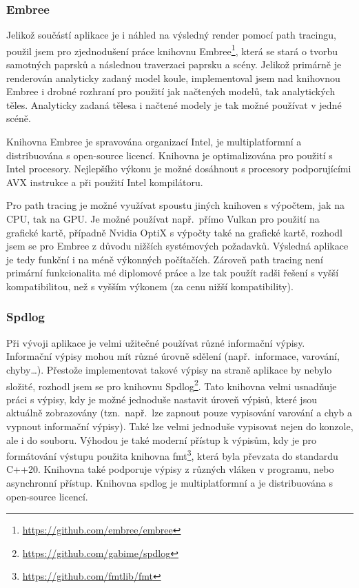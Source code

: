 \documentclass[czech,master]{diploma}
\begin{document}
\subsubsection{Embree}
Jelikož součástí aplikace je i náhled na výsledný render pomocí path tracingu, použil jsem pro zjednodušení práce knihovnu Embree\footnote{\url{https://github.com/embree/embree}}, která se stará o tvorbu samotných paprsků a následnou traverzaci paprsku a scény. Jelikož primárně je renderován analyticky zadaný model koule, implementoval jsem nad knihovnou Embree i drobné rozhraní pro použití jak načtených modelů, tak analytických těles. Analyticky zadaná tělesa i načtené modely je tak možné používat v jedné scéně. \par
Knihovna Embree je spravována organizací Intel, je multiplatformní a distribuována s open-source licencí. Knihovna je optimalizována pro použití s Intel procesory. Nejlepšího výkonu je možné dosáhnout s procesory podporujícími AVX instrukce a při použití Intel kompilátoru. \par
Pro path tracing je možné využívat spoustu jiných knihoven s výpočtem, jak na CPU, tak na GPU\@. Je možné používat např.\ přímo Vulkan pro použití na grafické kartě, případně Nvidia OptiX s výpočty také na grafické kartě, rozhodl jsem se pro Embree z důvodu nižších systémových požadavků. Výsledná aplikace je tedy funkční i na méně výkonných počítačích. Zároveň path tracing není primární funkcionalita mé diplomové práce a lze tak použít radši řešení s vyšší kompatibilitou, než s vyšším výkonem (za cenu nižší kompatibility).

\subsubsection{Spdlog}
Při vývoji aplikace je velmi užitečné používat různé informační výpisy. Informační výpisy mohou mít různé úrovně sdělení (např.\ informace, varování, chyby\dots). Přestože implementovat takové výpisy na straně aplikace by nebylo složité, rozhodl jsem se pro knihovnu Spdlog\footnote{\url{https://github.com/gabime/spdlog}}. Tato knihovna velmi usnadňuje práci s výpisy, kdy je možné jednoduše nastavit úroveň výpisů, které jsou aktuálně zobrazovány (tzn.\ např.\ lze zapnout pouze vypisování varování a chyb a vypnout informační výpisy). Také lze velmi jednoduše vypisovat nejen do konzole, ale i do souboru. Výhodou je také moderní přístup k výpisům, kdy je pro formátování výstupu použita knihovna fmt\footnote{\url{https://github.com/fmtlib/fmt}}, která byla převzata do standardu C++20. Knihovna také podporuje výpisy z různých vláken v programu, nebo asynchronní přístup. Knihovna spdlog je multiplatformní a je distribuována s open-source licencí.
\end{document}
